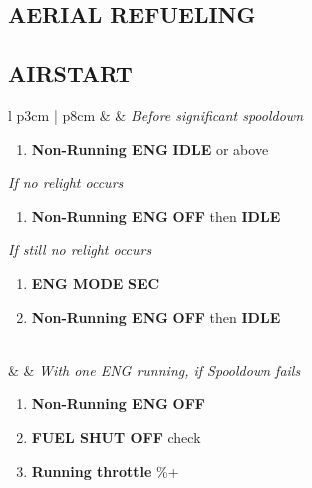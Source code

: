 \documentclass[10pt,usenames,dvipsnames,twoside]{report}
\begin{document}
	\subsection{AERIAL REFUELING}

	\clearpage

	\subsection{AIRSTART}
	\begin{center}
		\begin{longtable}{l p{3cm} | p{8cm}}
			\toprule
			\textbullet &  & \emph{Before significant spooldown}
			\begin{minipage}[t]{\linewidth}
				\vspace{-7pt}
				\begin{enumerate}
					\item \textbf{Non-Running ENG} \dotfill \textbf{IDLE} or above
				\end{enumerate}
				\vspace{7pt}
				\emph{If no relight occurs}
				\begin{enumerate}[label=(\alph*), resume]
					\vspace{-7pt}
					\item \textbf{Non-Running ENG} \dotfill \textbf{OFF} then \textbf{IDLE}
				\end{enumerate}
				\vspace{-7pt}
				\emph{If still no relight occurs}
				\begin{enumerate}[label=(\alph*), resume]
					\vspace{-7pt}
					\item \textbf{ENG MODE} \dotfill \textbf{SEC}
					\item \textbf{Non-Running ENG} \dotfill \textbf{OFF} then \textbf{IDLE}
				\end{enumerate}
			\end{minipage} \\
			\midrule
			\textbullet &  &
			\emph{With one ENG running, if Spooldown fails}
			\begin{minipage}[t]{\linewidth}
				\vspace{-7pt}
				\begin{enumerate}
					\item \textbf{Non-Running ENG} \dotfill \textbf{OFF}
					\item \textbf{FUEL SHUT OFF} \dotfill check
					\item \textbf{Running throttle} \%+

\end{enumerate}
\end{minipage}
\end{longtable}
\end{center}
\end{document}
